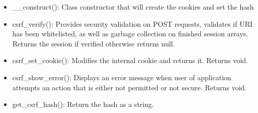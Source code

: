 \begin{itemize}
\item
  \_\_construct(): Class constructor that will create the cookies and
  set the hash
\item
  csrf\_verify(): Provides security validation on POST requests,
  validates if URI has been whitelisted, as well as garbage collection
  on finished session arrays. Returns the session if verified otherwise
  returns null.
\item
  csrf\_set\_cookie(): Modifies the internal cookie and returns it.
  Returns void.
\item
  csrf\_show\_error(): Displays an error message when user of
  application attempts an action that is either not permitted or not
  secure. Returns void.
\item
  get\_csrf\_hash(): Return the hash as a string.
\end{itemize}
